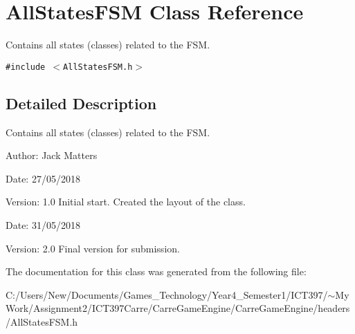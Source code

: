 \hypertarget{class_all_states_f_s_m}{
\section{AllStatesFSM Class Reference}
\label{class_all_states_f_s_m}
}
Contains all states (classes) related to the FSM.  


{\tt \#include $<$AllStatesFSM.h$>$}



\subsection{Detailed Description}
Contains all states (classes) related to the FSM. 

\begin{Desc}
\item[Author:]Jack Matters\end{Desc}
\begin{Desc}
\item[Date:]27/05/2018 \end{Desc}
\begin{Desc}
\item[Version:]1.0 Initial start. Created the layout of the class.\end{Desc}
\begin{Desc}
\item[Date:]31/05/2018 \end{Desc}
\begin{Desc}
\item[Version:]2.0 Final version for submission. \end{Desc}


The documentation for this class was generated from the following file:\begin{CompactItemize}
\item 
C:/Users/New/Documents/Games\_\-Technology/Year4\_\-Semester1/ICT397/$\sim$My Work/Assignment2/ICT397Carre/CarreGameEngine/CarreGameEngine/headers/AllStatesFSM.h\end{CompactItemize}
